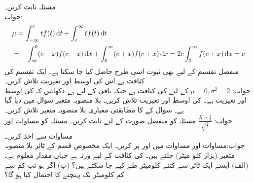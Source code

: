 
\quad
مسئلہ  ثابت کریں۔\\
جواب:\quad
\begin{align*}
&\mu=\int_{-\infty}^{c} tf(t)\dif t+\int_{c}^{\infty}tf(t)\dif t\\
&=-\int_{\infty}^{0}(c-x)f(c-x)\dif x+\int_{0}^{\infty}(c+x)f(c+x)\dif x=2c\int_{0}^{\infty}f(c+x)\dif x=c
\end{align*}
منفصل تقسیم کے لیے بھی ثبوت اسی طرح حاصل کیا جا سکتا ہے۔
\quad
ایک تقسیم کی کثافت   ہے۔اس  کی اوسط اور تغیریت تلاش کریں۔\\
جواب:\quad
$\mu=0,\sigma^2=2$
\quad
{} کے لیے  کی کثافت  ہے جبکہ باقی  کے لیے  ہے۔دکھائیں کہ  کی اوسط  اور تغیریت  ہے۔
\quad
{} کی اوسط اور تغیریت تلاش کریں۔ بلا منصوبہ متغیر  سوال  میں دیا گیا ہے۔
\quad
سوال  کے  کا مطابقتی معیاری بلا منصوبہ متغیر  تلاش کریں۔\\
جواب:\quad
$\tfrac{X-\tfrac{4}{3}}{\sqrt{\tfrac{2}{9}}}$
\quad
مسئلہ  کو منفصل صورت کے لیے ثابت کریں۔
\quad
مسئلہ  کو مساوات  اور مساوات  سے اخذ کریں۔\\
جواب:\quad مساوات  اور مساوات  میں  اور  پر کریں۔
\quad
ایک مخصوص قسم کے ٹائر بلا منصوبہ متغیر  (ہزار کلو میٹر) چلتے ہیں۔ کی کثافت  کے لیے  ورنہ  ہے جہاں  مقدار معلوم ہے۔ (الف) ایسے ایک ٹائر سے کتنے کلومیٹر طے کیے جا سکتے ہیں؟ (ب) اگر  ہو تب کم سے کم  کلومیٹر تک پہنچنے کا احتمال کیا ہو گا؟
\quad
